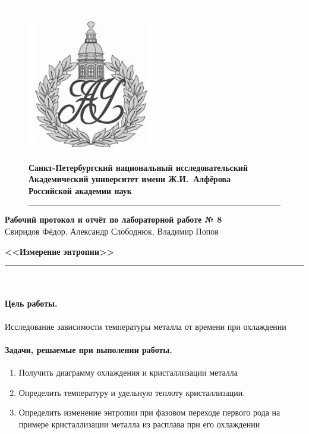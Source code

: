 \documentclass[a4paper]{article}
\begin{document}
\begin{figure}[htb]
	\begin{minipage}[c]{0.12\textwidth}
		\includegraphics[scale=0.25]{AU}
	\end{minipage}
	\hfill
	\begin{minipage}[t]{0.9\textwidth}
		{\Large\bfseries Санкт-Петербургский национальный исследовательский Академический университет имени Ж.И.~Алфёрова\\Российской академии наук}
	\end{minipage}
	\rule{164mm}{0.3mm}
\end{figure}

\begin{center}
	{\large\textbf{Рабочий протокол и отчёт по лабораторной работе № 8}}\\
	Свиридов Фёдор, Александр Слободнюк, Владимир Попов
\end{center}
\begin{center}
	\large\bfseries{<<Измерение энтропии>>}
	
	\parindent=5cm
	\rule{5cm}{0.2mm}\\
\end{center}

\paragraph{Цель работы.} Исследование зависимости температуры металла от времени при охлаждении
\paragraph{Задачи, решаемые при выполении работы.}
\begin{enumerate}
	\item Получить диаграмму охлаждения и кристаллизации металла
	\item Определить температуру и удельную теплоту кристаллизации.
	\item Определить изменение энтропии при фазовом переходе первого рода на примере кристаллизации металла из расплава при его охлаждении
\end{enumerate}
\end{document}
